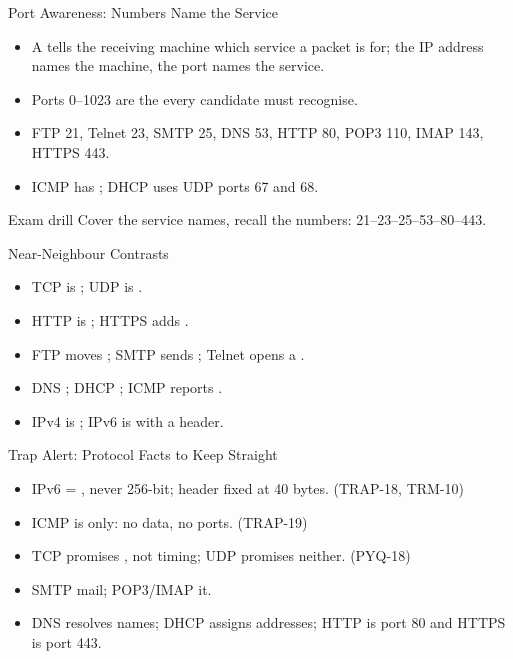 \documentclass[aspectratio=169]{beamer}
\begin{document}
\begin{frame}{Port Awareness: Numbers Name the Service}
  \begin{itemize}
    \item A  tells the receiving machine which service a
      packet is for; the IP address names the machine, the port names the
      service.
    \item Ports 0--1023 are the  every candidate must
      recognise.
    \item FTP 21, Telnet 23, SMTP 25, DNS 53, HTTP 80, POP3 110, IMAP 143,
      HTTPS 443.
    \item ICMP has ; DHCP uses UDP ports 67 and 68.
  \end{itemize}
  \begin{block}{Exam drill}
    Cover the service names, recall the numbers: 21--23--25--53--80--443.
  \end{block}
\end{frame}

\begin{frame}{Near-Neighbour Contrasts}
  \begin{itemize}
    \item TCP is ; UDP is .
    \item HTTP is ; HTTPS adds .
    \item FTP moves ; SMTP sends ; Telnet opens a
      .
    \item DNS ; DHCP ; ICMP
      reports .
    \item IPv4 is ; IPv6 is  with a  header.
  \end{itemize}
\end{frame}

\begin{frame}{Trap Alert: Protocol Facts to Keep Straight}
  \begin{itemize}
    \item IPv6 = , never 256-bit; header fixed at 40 bytes.
      (TRAP-18, TRM-10)
    \item ICMP is  only: no data, no ports.
      (TRAP-19)
    \item TCP promises , not timing; UDP promises neither.
      (PYQ-18)
    \item SMTP  mail; POP3/IMAP  it.
    \item DNS resolves names; DHCP assigns addresses; HTTP is port 80 and
      HTTPS is port 443.
  \end{itemize}
\end{frame}
\end{document}
